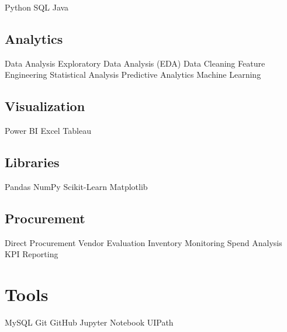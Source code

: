 \documentclass[]{deedy-resume-reversed}
\begin{document}
\begin{minipage}[t]{0.30\textwidth}
\textbullet{} Python \textbullet{} SQL \textbullet{} Java


\sectionsep

\subsection{Analytics}

\textbullet{} Data Analysis \textbullet{} Exploratory Data Analysis (EDA) \textbullet{} Data Cleaning \textbullet{} Feature Engineering \textbullet{}Statistical Analysis \textbullet{} Predictive Analytics \textbullet{} Machine Learning

\sectionsep

\subsection{Visualization}

\textbullet{} Power BI \textbullet{} Excel \textbullet{} Tableau

\sectionsep

\subsection{Libraries}

\textbullet{} Pandas \textbullet{} NumPy \textbullet{} Scikit-Learn 
\textbullet{} Matplotlib

\sectionsep

\subsection{Procurement}

\textbullet{} Direct Procurement \textbullet{} Vendor Evaluation \textbullet{} Inventory Monitoring  \textbullet{} Spend Analysis \textbullet{} KPI Reporting


\sectionsep


\section{Tools}

\textbullet{} MySQL \textbullet{} Git \textbullet{} GitHub \textbullet{} Jupyter Notebook
\textbullet{} UIPath

\sectionsep



\end{minipage}
\end{document}
